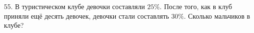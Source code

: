 55. В туристическом клубе девочки составляли $25\%.$ После того, как в клуб приняли ещё десять девочек, девочки стали составлять $30\%.$ Сколько мальчиков в клубе?\\
